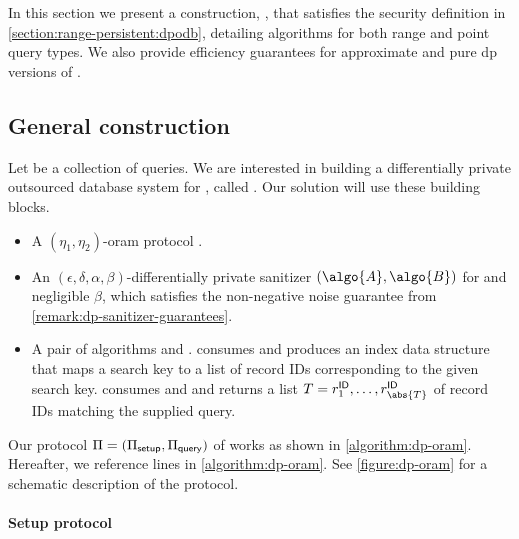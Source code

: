 \section{\texorpdfstring{\epsolute{}}{Epsolute}}\label{section:range-persistent:dp-oram}

	In this section we present a construction, \epsolute{}, that satisfies the security definition in \cref{section:range-persistent:dpodb}, detailing algorithms for both range and point query types.
	We also provide efficiency guarantees for approximate and pure \acrshort{dp} versions of \epsolute{}.

	\subsection{General construction}

		Let \querySet{} be a collection of queries.
		We are interested in building a differentially private outsourced database system for \querySet{}, called \epsolute{}.
		Our solution will use these building blocks.
		\begin{itemize}
			\item
				A $(\eta_1, \eta_2)$-\acrshort{oram} protocol .
			\item
				An $(\epsilon, \delta, \alpha, \beta)$-differentially private sanitizer $(\algo{A}, \algo{B})$ for \querySet{} and negligible $\beta$, which satisfies the non-negative noise guarantee from \cref{remark:dp-sanitizer-guarantees}.
			\item
				A pair of algorithms  and .
				 consumes \database{} and produces an index data structure \indexI{} that maps a search key \searchKey{} to a list of record IDs \recordID{} corresponding to the given search key.
				 consumes \indexI{} and \query{} and returns a list $T = \fromNtoM{\recordID}{1}{{\abs{T}}}$ of record IDs matching the supplied query.
		\end{itemize}

		Our protocol $\Pi = (\Pi_{\mathsf{setup}}, \Pi_{\mathsf{query}})$ of \epsolute{} works as shown in \cref{algorithm:dp-oram}.
		Hereafter, we reference lines in \cref{algorithm:dp-oram}.
		See \cref{figure:dp-oram} for a schematic description of the protocol.

		\paragraph*{Setup protocol \; \texorpdfstring{\protocolSetup{}}{}}

